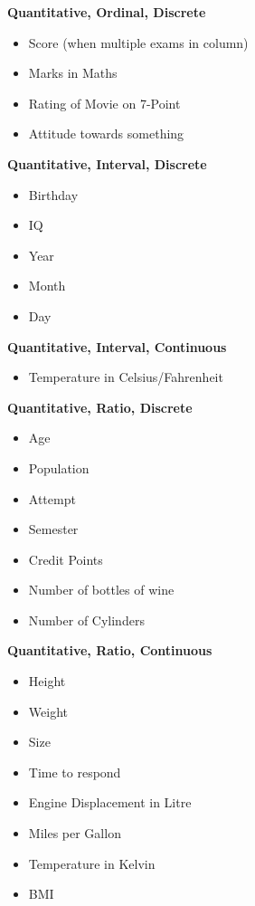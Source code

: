 \textbf{Quantitative, Ordinal, Discrete}
\begin{itemize}
    \item Score (when multiple exams in column)
    \item Marks in Maths
    \item Rating of Movie on 7-Point
    \item Attitude towards something
\end{itemize}




\textbf{Quantitative, Interval, Discrete}
\begin{itemize}
    \item Birthday
    \item IQ
    \item Year
    \item Month
    \item Day
\end{itemize}

\textbf{Quantitative, Interval, Continuous}
\begin{itemize}
    \item Temperature in Celsius/Fahrenheit
\end{itemize}

\textbf{Quantitative, Ratio, Discrete}
\begin{itemize}
    \item Age
    \item Population
    \item Attempt
    \item Semester
    \item Credit Points
    \item Number of bottles of wine
    \item Number of Cylinders
\end{itemize}

\columnbreak

\textbf{Quantitative, Ratio, Continuous}
\begin{itemize}
    \item Height
    \item Weight
    \item Size
    \item Time to respond
    \item Engine Displacement in Litre
    \item Miles per Gallon
    \item Temperature in Kelvin
    \item BMI
\end{itemize}

